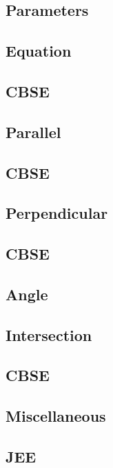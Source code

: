 \documentclass[journal]{IEEEtran}
\begin{document}
	\subsection{Parameters}
	
	\subsection{Equation }
	
	\subsection{CBSE}
	
	\subsection{Parallel}
	
	\subsection{CBSE}
	
	\subsection{Perpendicular}
	
	\subsection{CBSE}
	
	\subsection{Angle}
	
	\subsection{Intersection}
	
	\subsection{CBSE}
	
	\subsection{Miscellaneous }
	
	\subsection{JEE}
	
	\newpage
\end{document}
